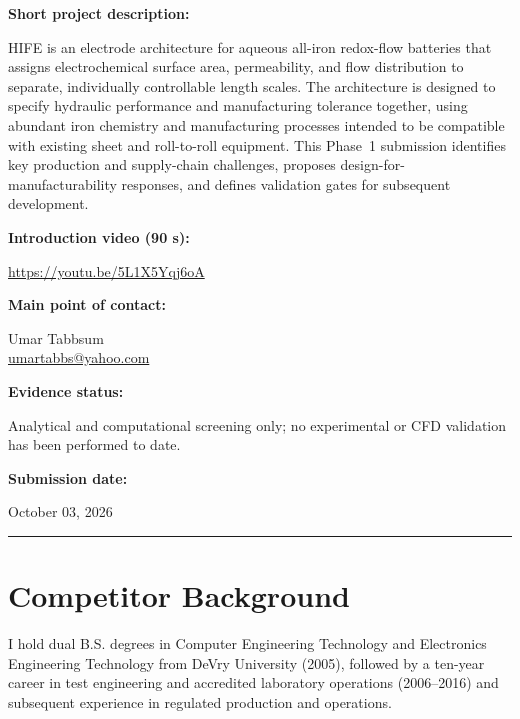 \documentclass[11pt,letterpaper]{article}
\begin{document}
\noindent
\textbf{Short project description:}\par
HIFE is an electrode architecture for aqueous all-iron redox-flow batteries
that assigns electrochemical surface area, permeability, and flow
distribution to separate, individually controllable length scales. The
architecture is designed to specify hydraulic performance and manufacturing
tolerance together, using abundant iron chemistry and manufacturing
processes intended to be compatible with existing sheet and roll-to-roll
equipment. This Phase~1 submission identifies key production and
supply-chain challenges, proposes design-for-manufacturability responses,
and defines validation gates for subsequent development.

\vspace{0.30em}

\noindent
\textbf{Introduction video (90 s):}\par
\url{https://youtu.be/5L1X5Yqj6oA}

\vspace{0.30em}

\noindent
\textbf{Main point of contact:}\par
Umar Tabbsum\\
\href{mailto:umartabbs@yahoo.com}{umartabbs@yahoo.com}

\vspace{0.30em}

\noindent
\textbf{Evidence status:}\par
Analytical and computational screening only; no experimental or CFD
validation has been performed to date.

\vspace{0.30em}

\noindent
\textbf{Submission date:}\par
October 03, 2026

\vfill

{\color{HIFENavy}\rule{\textwidth}{1.2pt}}

\newpage


\section{Competitor Background}

I hold dual B.S. degrees in Computer Engineering Technology and Electronics
Engineering Technology from DeVry University (2005), followed by a
ten-year career in test engineering and accredited laboratory operations
(2006--2016) and subsequent experience in regulated production and
operations.
\end{document}
